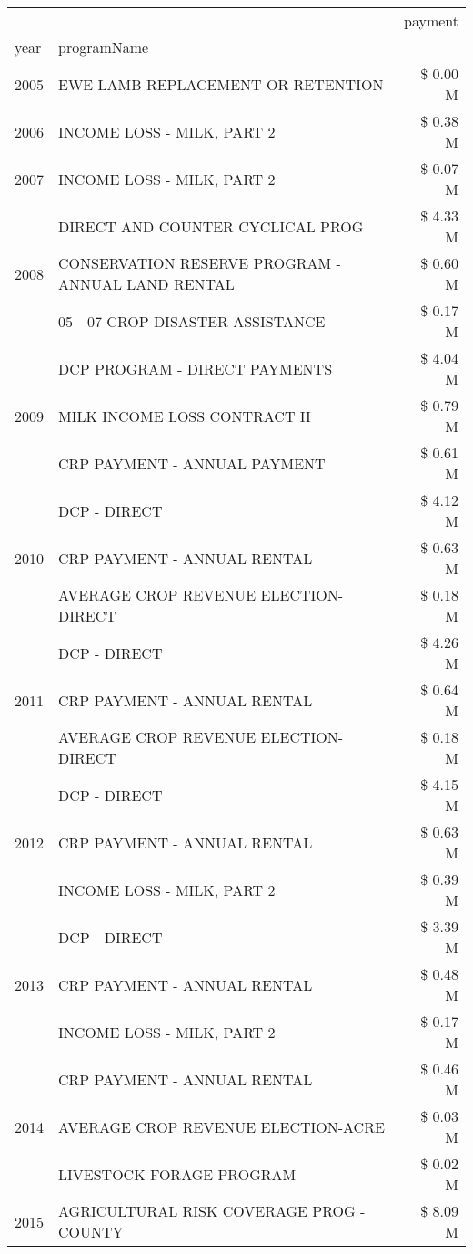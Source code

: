 \begin{tabular}{llr}
\toprule
 &  & payment \\
year & programName &  \\
\midrule
2005 & EWE LAMB REPLACEMENT OR RETENTION & \$ 0.00 M \\
\cline{1-3}
2006 & INCOME LOSS - MILK, PART 2 & \$ 0.38 M \\
\cline{1-3}
2007 & INCOME LOSS - MILK, PART 2 & \$ 0.07 M \\
\cline{1-3}
\multirow[t]{3}{*}{2008} & DIRECT AND COUNTER CYCLICAL PROG & \$ 4.33 M \\
 & CONSERVATION RESERVE PROGRAM - ANNUAL LAND RENTAL & \$ 0.60 M \\
 & 05 - 07 CROP DISASTER ASSISTANCE & \$ 0.17 M \\
\cline{1-3}
\multirow[t]{3}{*}{2009} & DCP PROGRAM - DIRECT PAYMENTS & \$ 4.04 M \\
 & MILK INCOME LOSS CONTRACT II & \$ 0.79 M \\
 & CRP PAYMENT - ANNUAL PAYMENT & \$ 0.61 M \\
\cline{1-3}
\multirow[t]{3}{*}{2010} & DCP - DIRECT & \$ 4.12 M \\
 & CRP PAYMENT - ANNUAL RENTAL & \$ 0.63 M \\
 & AVERAGE CROP REVENUE ELECTION-DIRECT & \$ 0.18 M \\
\cline{1-3}
\multirow[t]{3}{*}{2011} & DCP - DIRECT & \$ 4.26 M \\
 & CRP PAYMENT - ANNUAL RENTAL & \$ 0.64 M \\
 & AVERAGE CROP REVENUE ELECTION-DIRECT & \$ 0.18 M \\
\cline{1-3}
\multirow[t]{3}{*}{2012} & DCP - DIRECT & \$ 4.15 M \\
 & CRP PAYMENT - ANNUAL RENTAL & \$ 0.63 M \\
 & INCOME LOSS - MILK, PART 2 & \$ 0.39 M \\
\cline{1-3}
\multirow[t]{3}{*}{2013} & DCP - DIRECT & \$ 3.39 M \\
 & CRP PAYMENT - ANNUAL RENTAL & \$ 0.48 M \\
 & INCOME LOSS - MILK, PART 2 & \$ 0.17 M \\
\cline{1-3}
\multirow[t]{3}{*}{2014} & CRP PAYMENT - ANNUAL RENTAL & \$ 0.46 M \\
 & AVERAGE CROP REVENUE ELECTION-ACRE & \$ 0.03 M \\
 & LIVESTOCK FORAGE PROGRAM & \$ 0.02 M \\
\cline{1-3}
\multirow[t]{3}{*}{2015} & AGRICULTURAL RISK COVERAGE PROG - COUNTY & \$ 8.09 M \\

\end{tabular}
